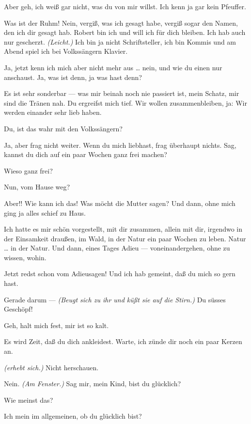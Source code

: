 \documentclass[
	final,
	a4paper,
	ngerman,
	mpinclude = true, %
	twoside = true,
	open = right,
	cleardoublepage = plain,
	DIV = 13,
	BCOR = 1cm,
	titlepage = firstiscover,
	]{scrbook}
\newcommand{\direction}[1]{\textit{(#1)}}
\newcommand{\thecharacter}[1]{\textup{\textsc{#1}}\xspace}
\newcommand{\thesuesse}{\thecharacter{Süßes Mädel}}
\newcommand{\thedichter}{\thecharacter{Dichter}}
\newcommand{\character}[1]{\item[#1:]}
\newcommand{\suesse}{\character{\thesuesse}}
\newcommand{\dichter}{\character{\thedichter}}
\begin{document}
\begin{play}
	\suesse
	Aber geh, ich weiß gar nicht, was du von mir willst. Ich kenn ja gar kein Pfeuffer.

	\dichter
	Was ist der Ruhm! Nein, vergiß, was ich gesagt habe, vergiß sogar den Namen, den ich dir gesagt hab. Robert bin ich und will ich für dich bleiben. Ich hab auch nur gescherzt. \direction{Leicht.} Ich bin ja nicht Schriftsteller, ich bin Kommis und am Abend spiel ich bei Volkssängern Klavier.

	\suesse
	Ja, jetzt kenn ich mich aber nicht mehr aus \ldots{} nein, und wie du einen nur anschaust. Ja, was ist denn, ja was hast denn?

	\dichter
	Es ist sehr sonderbar --- was mir beinah noch nie passiert ist, mein Schatz, mir sind die Tränen nah. Du ergreifst mich tief. Wir wollen zusammenbleiben, ja: Wir werden einander sehr lieb haben.

	\suesse
	Du, ist das wahr mit den Volkssängern?

	\dichter
	Ja, aber frag nicht weiter. Wenn du mich liebhast, frag überhaupt nichts. Sag, kannst du dich auf ein paar Wochen ganz frei machen?

	\suesse
	Wieso ganz frei?

	\dichter
	Nun, vom Hause weg?

	\suesse
	Aber!! Wie kann ich das! Was möcht die Mutter sagen? Und dann, ohne mich ging ja alles schief zu Haus.

	\dichter
	Ich hatte es mir schön vorgestellt, mit dir zusammen, allein mit dir, irgendwo in der Einsamkeit draußen, im Wald, in der Natur ein paar Wochen zu leben. Natur \ldots{} in der Natur. Und dann, eines Tages Adieu --- voneinandergehen, ohne zu wissen, wohin.

	\suesse
	Jetzt redst schon vom Adieusagen! Und ich hab gemeint, daß du mich so gern hast.

	\dichter
	Gerade darum --- \direction{Beugt sich zu ihr und küßt sie auf die Stirn.} Du süsses Geschöpf!

	\suesse
	Geh, halt mich fest, mir ist so kalt.

	\dichter
	Es wird Zeit, daß du dich ankleidest. Warte, ich zünde dir noch ein paar Kerzen an.

	\suesse
	\direction{erhebt sich.} Nicht herschauen.

	\dichter
	Nein. \direction{Am Fenster.} Sag mir, mein Kind, bist du glücklich?

	\suesse
	Wie meinst das?

	\dichter
	Ich mein im allgemeinen, ob du glücklich bist?


\end{play}
\end{document}
